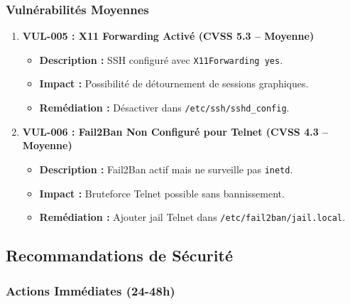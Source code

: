 \documentclass[12pt,a4paper,openany]{report}
\begin{document}
	\subsubsection{Vulnérabilités Moyennes}
	
	\begin{enumerate}
		\item \textbf{VUL-005 : X11 Forwarding Activé (CVSS 5.3 -- Moyenne)}
		\begin{itemize}
			\item \textbf{Description :} SSH configuré avec \texttt{X11Forwarding yes}.
			\item \textbf{Impact :} Possibilité de détournement de sessions graphiques.
			\item \textbf{Remédiation :} Désactiver dans \texttt{/etc/ssh/sshd\_config}.
		\end{itemize}
		
		\item \textbf{VUL-006 : Fail2Ban Non Configuré pour Telnet (CVSS 4.3 -- Moyenne)}
		\begin{itemize}
			\item \textbf{Description :} Fail2Ban actif mais ne surveille pas \texttt{inetd}.
			\item \textbf{Impact :} Bruteforce Telnet possible sans bannissement.
			\item \textbf{Remédiation :} Ajouter jail Telnet dans \texttt{/etc/fail2ban/jail.local}.
		\end{itemize}
	\end{enumerate}
	
	\subsection{Recommandations de Sécurité}
	
	\subsubsection{Actions Immédiates (24-48h)}
	
\end{document}
